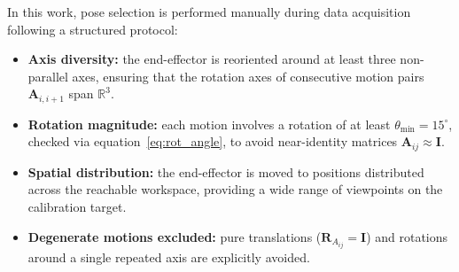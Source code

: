 In this work, pose selection is performed manually during data acquisition
following a structured protocol:

\begin{itemize}
    \item \textbf{Axis diversity:} the end-effector is reoriented around
    at least three non-parallel axes, ensuring that the rotation axes of
    consecutive motion pairs $\mathbf{A}_{i,i+1}$ span $\mathbb{R}^3$.

    \item \textbf{Rotation magnitude:} each motion involves a rotation of at
    least $\theta_{\min} = 15^{\circ}$, checked via
    equation~\eqref{eq:rot_angle}, to avoid near-identity matrices
    $\mathbf{A}_{ij} \approx \mathbf{I}$.

    \item \textbf{Spatial distribution:} the end-effector is moved to
    positions distributed across the reachable workspace, providing a wide
    range of viewpoints on the calibration target.

    \item \textbf{Degenerate motions excluded:} pure translations
    ($\mathbf{R}_{A_{ij}} = \mathbf{I}$) and rotations around a single
    repeated axis are explicitly avoided.
\end{itemize}



















